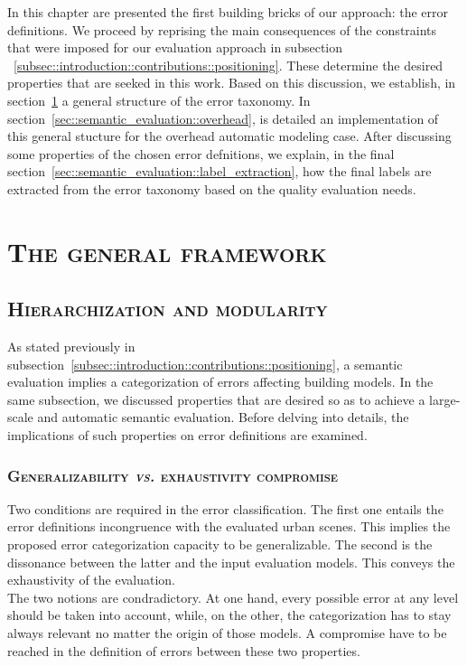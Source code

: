 \minitoc

\vfill

In this chapter are presented the first building bricks of our approach: the error definitions.
We proceed by reprising the main consequences of the constraints that were imposed for our evaluation approach in subsection ~\ref{subsec::introduction::contributions::positioning}.
These determine the desired properties that are seeked in this work.
Based on this discussion, we establish, in section~\ref{sec::semantic_evaluation::general_framework} a general structure of the error taxonomy.
In section~\ref{sec::semantic_evaluation::overhead}, is detailed an implementation of this general stucture for the overhead automatic modeling case.
After discussing some properties of the chosen error defnitions, we explain, in the final section~\ref{sec::semantic_evaluation::label_extraction}, how the final labels are extracted from the error taxonomy based on the quality evaluation needs.

\clearpage

\section{\textsc{The general framework}}
    \label{sec::semantic_evaluation::general_framework}

    \subsection{\textsc{Hierarchization and modularity}}
        \label{subsec::semantic_evaluation::general_framework::hierarchization_moderularity}
        As stated previously in subsection~\ref{subsec::introduction::contributions::positioning}, a semantic evaluation implies a categorization of errors affecting building models.
        In the same subsection, we discussed properties that are desired so as to achieve a large-scale and automatic semantic evaluation.
        Before delving into details, the implications of such properties on error definitions are examined.

        \subsubsection{\textsc{Generalizability \textit{vs.} exhaustivity compromise}}
            Two conditions are required in the error classification.
            The first one entails the error definitions incongruence with the evaluated urban scenes.
            This implies the proposed error categorization capacity to be generalizable.
            The second is the dissonance between the latter and the input evaluation models.
            This conveys the exhaustivity of the evaluation.\\
            The two notions are condradictory.
            At one hand, every possible error at any level should be taken into account, while, on the other, the categorization has to stay always relevant no matter the origin of those models.
            A compromise have to be reached in the definition of errors between these two properties.
        
